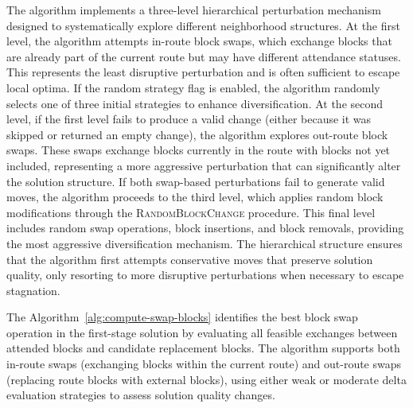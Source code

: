 The algorithm implements a three-level hierarchical perturbation mechanism designed to systematically explore different neighborhood structures. At the first level, the algorithm attempts in-route block swaps, which exchange blocks that are already part of the current route but may have different attendance statuses. This represents the least disruptive perturbation and is often sufficient to escape local optima. If the random strategy flag is enabled, the algorithm randomly selects one of three initial strategies to enhance diversification. At the second level, if the first level fails to produce a valid change (either because it was skipped or returned an empty change), the algorithm explores out-route block swaps. These swaps exchange blocks currently in the route with blocks not yet included, representing a more aggressive perturbation that can significantly alter the solution structure. If both swap-based perturbations fail to generate valid moves, the algorithm proceeds to the third level, which applies random block modifications through the \textsc{RandomBlockChange} procedure. This final level includes random swap operations, block insertions, and block removals, providing the most aggressive diversification mechanism. The hierarchical structure ensures that the algorithm first attempts conservative moves that preserve solution quality, only resorting to more disruptive perturbations when necessary to escape stagnation.

The Algorithm~\ref{alg:compute-swap-blocks} identifies the best block swap operation in the first-stage solution by evaluating all feasible exchanges between attended blocks and candidate replacement blocks. The algorithm supports both in-route swaps (exchanging blocks within the current route) and out-route swaps (replacing route blocks with external blocks), using either weak or moderate delta evaluation strategies to assess solution quality changes.


